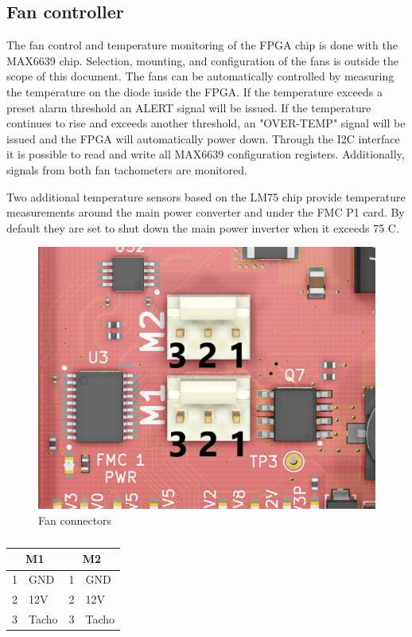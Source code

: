 \documentclass[12pt,oneside,a4]{article}
\begin{document}
\subsection{Fan controller}
The fan control and temperature monitoring of the FPGA chip is done with the MAX6639 chip. Selection, mounting, and configuration of the fans is outside the scope of this document. The fans can be automatically controlled by measuring the temperature on the diode inside the FPGA. If the temperature exceeds a preset alarm threshold an ALERT signal will be issued. If the temperature continues to rise and exceeds another threshold, an "OVER-TEMP" signal will be issued and the FPGA will automatically power down. Through the I2C interface it is possible to read and write all MAX6639 configuration registers. Additionally, signals from both fan tachometers are monitored.

Two additional temperature sensors based on the LM75 chip provide temperature measurements around the main power converter and under the FMC P1 card. By default they are set to shut down the main power inverter when it exceeds 75 C.

\begin{figure}[H]
\begin{center}
\includegraphics[width=0.6\linewidth]{fans.png}
 \caption{Fan connectors}\label{fans}
\end{center}
\end{figure}

\begin{table}[htbp]
\centering
\begin{tabular}{@{}llll@{}}
\toprule
\multicolumn{2}{c}{\textbf{M1}} & \multicolumn{2}{c}{\textbf{M2}} \\ \midrule
1            & GND              & 1            & GND              \\
2            & 12V              & 2            & 12V              \\
3            & Tacho            & 3            & Tacho            \\ \bottomrule
\end{tabular}
\caption{}
\label{tab:fan_connectors}
\end{table}
\end{document}
